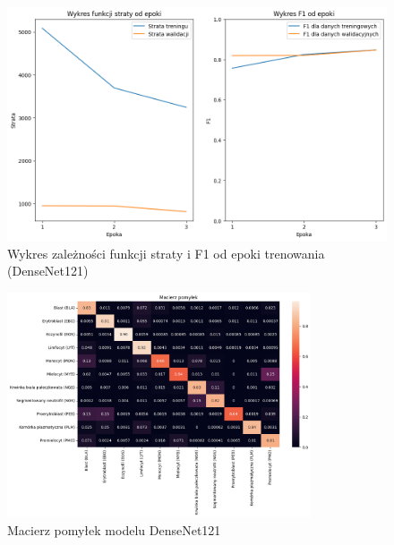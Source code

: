 \begin{figure}
    \centering
    \includegraphics[width=\textwidth]{experiments/densenet121/combined}
    \caption{Wykres zależności funkcji straty i F1 od epoki trenowania (DenseNet121)}
    \label{fig:plot_densenet121}
\end{figure}
\begin{figure}
    \centering
    \includegraphics[width=0.8\textwidth]{experiments/densenet121/confusion_matrix}
    \caption{Macierz pomyłek modelu DenseNet121}
    \label{fig:confusion_densenet121}
\end{figure}


